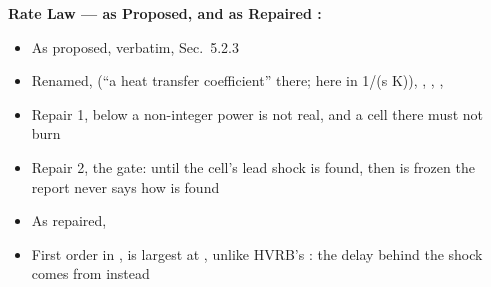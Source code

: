 \documentclass[11pt,addpoints]{exam}
\begin{document}
\clearpage

\begin{tcolorbox}[breakable]
\textbf{Rate Law --- as Proposed, and as Repaired \cite{kittell2025sand}:}\vspace{.5em}
\begin{itemize}
\item As proposed, \hspace{3mm}  \hspace{5mm} verbatim, Sec.~5.2.3\vspace{1.0em}
\item Renamed, \hspace{3mm}  (``a heat transfer coefficient'' there; here in 1/(\bm{$\mu$}s K)), \hspace{2mm} , \hspace{2mm} , \hspace{2mm} , \hspace{2mm} \vspace{1.0em}
\item Repair 1, \hspace{3mm}  \hspace{5mm} below  a non-integer power is not real, and a cell there must not burn\vspace{1.0em}
\item Repair 2, \hspace{3mm} the gate: \hspace{2mm}  until the cell's lead shock is found, \hspace{2mm} then  is frozen \hspace{5mm} the report never says how  is found\vspace{1.0em}
\item As repaired, \hspace{3mm} \vspace{1.0em}
\item First order in , \hspace{3mm}  is largest at , unlike HVRB's : \hspace{2mm} the delay behind the shock comes from  instead\vspace{.5em}

\end{itemize}
\end{tcolorbox}
\end{document}
